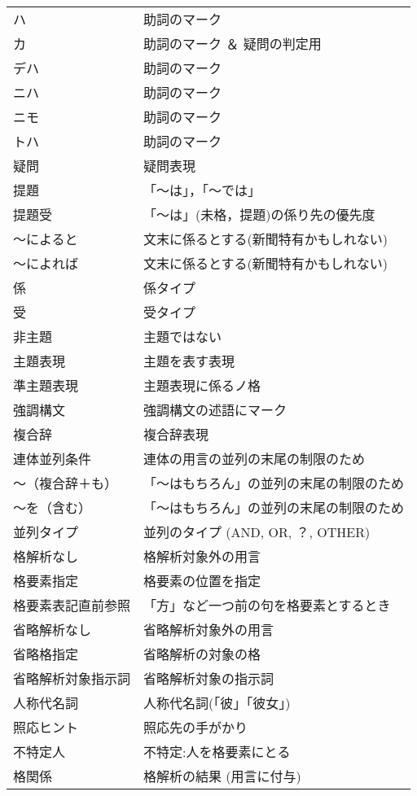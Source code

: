 \documentclass[a4j]{jarticle}
\begin{document}
\begin{supertabular}{p{4.2cm}p{9.6cm}}
ハ &   助詞のマーク\\
カ &   助詞のマーク ＆ 疑問の判定用\\
デハ & 助詞のマーク\\
ニハ & 助詞のマーク\\
ニモ & 助詞のマーク\\
トハ & 助詞のマーク\\
疑問 & 疑問表現\\
提題 & 「〜は」，「〜では」\\
提題受 & 「〜は」(未格，提題)の係り先の優先度\\
〜によると & 文末に係るとする(新聞特有かもしれない)\\
〜によれば & 文末に係るとする(新聞特有かもしれない)\\
係 & 係タイプ \\
受 & 受タイプ\\
非主題 & 主題ではない\\
主題表現 & 主題を表す表現\\
準主題表現 & 主題表現に係るノ格\\
強調構文 & 強調構文の述語にマーク\\
複合辞 & 複合辞表現\\
連体並列条件 & 連体の用言の並列の末尾の制限のため\\
〜（複合辞＋も） & 「〜はもちろん」の並列の末尾の制限のため\\
〜を（含む） & 「〜はもちろん」の並列の末尾の制限のため\\
並列タイプ & 並列のタイプ (AND, OR, ？, OTHER)\\
格解析なし & 格解析対象外の用言\\
格要素指定 & 格要素の位置を指定\\
格要素表記直前参照 & 「方」など一つ前の句を格要素とするとき\\
省略解析なし & 省略解析対象外の用言\\
省略格指定 & 省略解析の対象の格\\
省略解析対象指示詞 & 省略解析対象の指示詞\\
人称代名詞 & 人称代名詞(「彼」「彼女」)\\
照応ヒント & 照応先の手がかり\\
不特定人 & 不特定:人を格要素にとる\\
格関係 & 格解析の結果 (用言に付与)\\

\end{supertabular}
\end{document}
